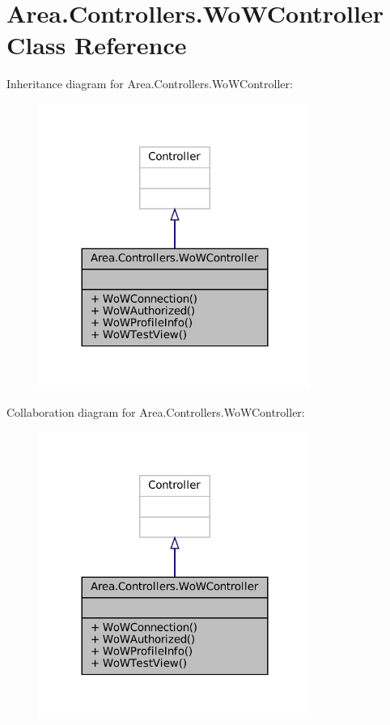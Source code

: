 \hypertarget{classArea_1_1Controllers_1_1WoWController}{}\section{Area.\+Controllers.\+Wo\+W\+Controller Class Reference}
\label{classArea_1_1Controllers_1_1WoWController}


Inheritance diagram for Area.\+Controllers.\+Wo\+W\+Controller\+:
\nopagebreak
\begin{figure}[H]
\begin{center}
\leavevmode
\includegraphics[width=252pt]{classArea_1_1Controllers_1_1WoWController__inherit__graph}
\end{center}
\end{figure}


Collaboration diagram for Area.\+Controllers.\+Wo\+W\+Controller\+:
\nopagebreak
\begin{figure}[H]
\begin{center}
\leavevmode
\includegraphics[width=252pt]{classArea_1_1Controllers_1_1WoWController__coll__graph}
\end{center}
\end{figure}
